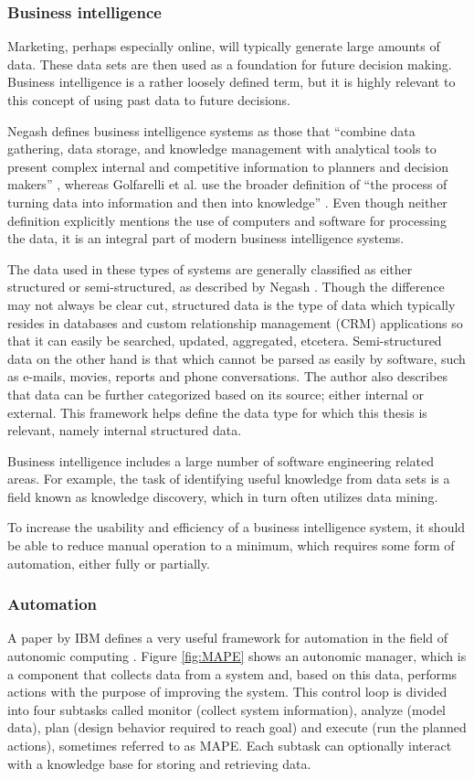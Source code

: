 \documentclass{sig-alternate}
\begin{document}
\subsubsection{Business intelligence}
Marketing, perhaps especially online, will typically generate large amounts of data. These data sets are then used as a foundation for future decision making. Business intelligence is a rather loosely defined term, but it is highly relevant to this concept of using past data to future decisions.

Negash defines business intelligence systems as those that ``combine data gathering, data storage, and knowledge management with analytical tools to present complex internal and competitive information to planners and decision makers'' \cite{Negash2004}, whereas Golfarelli et al. use the broader definition of ``the process of turning data into information and then into knowledge'' \cite{Golfarelli2004}. Even though neither definition explicitly mentions the use of computers and software for processing the data, it is an integral part of modern business intelligence systems.

The data used in these types of systems are generally classified as either structured or semi-structured, as described by Negash \cite{Negash2004}. Though the difference may not always be clear cut, structured data is the type of data which typically resides in databases and custom relationship management (CRM) applications so that it can easily be searched, updated, aggregated, etcetera. Semi-structured data on the other hand is that which cannot be parsed as easily by software, such as e-mails, movies, reports and phone conversations. The author also describes that data can be further categorized based on its source; either internal or external. This framework helps define the data type for which this thesis is relevant, namely internal structured data.

Business intelligence includes a large number of software engineering related areas. For example, the task of identifying useful knowledge from data sets is a field known as knowledge discovery, which in turn often utilizes data mining.

To increase the usability and efficiency of a business intelligence system, it should be able to reduce manual operation to a minimum, which requires some form of automation, either fully or partially.

\subsubsection{Automation}
A paper by IBM defines a very useful framework for automation in the field of autonomic computing \cite{IBM2006}. Figure \ref{fig:MAPE} shows an autonomic manager, which is a component that collects data from a system and, based on this data, performs actions with the purpose of improving the system. This control loop is divided into four subtasks called monitor (collect system information), analyze (model data), plan (design behavior required to reach goal) and execute (run the planned actions), sometimes referred to as MAPE. Each subtask can optionally interact with a knowledge base for storing and retrieving data.
\end{document}
